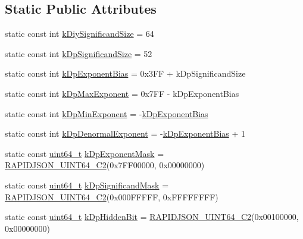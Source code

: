 \subsection*{Static Public Attributes}
\begin{DoxyCompactItemize}
\item 
static const int \hyperlink{structinternal_1_1DiyFp_aac30e0c32d43425ac403281fc9b0cee4}{k\+Diy\+Significand\+Size} = 64
\item 
static const int \hyperlink{structinternal_1_1DiyFp_a037aed0fa0b66af0a13657418edef19e}{k\+Dp\+Significand\+Size} = 52
\item 
static const int \hyperlink{structinternal_1_1DiyFp_a38b6f864ae0859d43fa96c3ff27959be}{k\+Dp\+Exponent\+Bias} = 0x3\+F\+F + k\+Dp\+Significand\+Size
\item 
static const int \hyperlink{structinternal_1_1DiyFp_a80535a5594dae96fc482757a54162c7d}{k\+Dp\+Max\+Exponent} = 0x7\+F\+F -\/ k\+Dp\+Exponent\+Bias
\item 
static const int \hyperlink{structinternal_1_1DiyFp_a9ad1b0cdbab318e45d2bc48e64707ef3}{k\+Dp\+Min\+Exponent} = -\/\hyperlink{structinternal_1_1DiyFp_a38b6f864ae0859d43fa96c3ff27959be}{k\+Dp\+Exponent\+Bias}
\item 
static const int \hyperlink{structinternal_1_1DiyFp_a994f16a1247a290cfc3a875715e3a92b}{k\+Dp\+Denormal\+Exponent} = -\/\hyperlink{structinternal_1_1DiyFp_a38b6f864ae0859d43fa96c3ff27959be}{k\+Dp\+Exponent\+Bias} + 1
\item 
static const \hyperlink{stdint_8h_aec6fcb673ff035718c238c8c9d544c47}{uint64\+\_\+t} \hyperlink{structinternal_1_1DiyFp_aaacbf068c44275f4451db750938bd1d3}{k\+Dp\+Exponent\+Mask} = \hyperlink{rapidjson_8h_aaee1245f375a71be1ac9b8a07ba5fb8f}{R\+A\+P\+I\+D\+J\+S\+O\+N\+\_\+\+U\+I\+N\+T64\+\_\+\+C2}(0x7\+F\+F00000, 0x00000000)
\item 
static const \hyperlink{stdint_8h_aec6fcb673ff035718c238c8c9d544c47}{uint64\+\_\+t} \hyperlink{structinternal_1_1DiyFp_a841ef0ae29ccd2889e7f96aad76b0179}{k\+Dp\+Significand\+Mask} = \hyperlink{rapidjson_8h_aaee1245f375a71be1ac9b8a07ba5fb8f}{R\+A\+P\+I\+D\+J\+S\+O\+N\+\_\+\+U\+I\+N\+T64\+\_\+\+C2}(0x000\+F\+F\+F\+F\+F, 0x\+F\+F\+F\+F\+F\+F\+F\+F)
\item 
static const \hyperlink{stdint_8h_aec6fcb673ff035718c238c8c9d544c47}{uint64\+\_\+t} \hyperlink{structinternal_1_1DiyFp_a43ea451ce20095b1ff53cccf132ca15f}{k\+Dp\+Hidden\+Bit} = \hyperlink{rapidjson_8h_aaee1245f375a71be1ac9b8a07ba5fb8f}{R\+A\+P\+I\+D\+J\+S\+O\+N\+\_\+\+U\+I\+N\+T64\+\_\+\+C2}(0x00100000, 0x00000000)
\end{DoxyCompactItemize}


